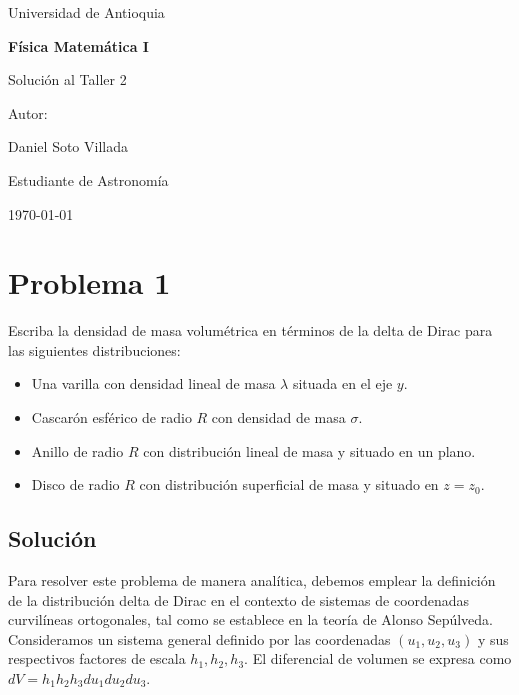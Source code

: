 \documentclass[a4paper]{article}
\begin{document}
\begin{titlepage}
  \centering
  {\Large Universidad de Antioquia\par}
  \vspace{2cm}
  {\huge\bfseries Física Matemática I\par}
  \vspace{0.4cm}
  {\Large Solución al Taller 2 \par}
  \vspace{2.5cm}
  {\large Autor:\par}
  \vspace{0.2cm}
  {\large Daniel Soto Villada\par}
  {\large Estudiante de Astronomía\par}
  \vfill
  {\large \today\par}
\end{titlepage}

\newpage
\tableofcontents
\newpage



\section{Problema 1}
Escriba la densidad de masa volumétrica en términos de la delta de Dirac para las siguientes distribuciones:
\begin{itemize}
    \item Una varilla con densidad lineal de masa $\lambda$ situada en el eje $y.$
    \item Cascarón esférico de radio $R$ con densidad de masa $\sigma.$
    \item Anillo de radio $R$ con distribución lineal de masa y situado en un plano.
    \item Disco de radio $R$ con distribución superficial de masa y situado en $z = z_0.$
\end{itemize}

\subsection{Solución}

Para resolver este problema de manera analítica, debemos emplear la definición de la distribución delta de Dirac en el contexto de sistemas de coordenadas curvilíneas ortogonales, tal como se establece en la teoría de Alonso Sepúlveda. Consideramos un sistema general definido por las coordenadas $(u_1, u_2, u_3)$ y sus respectivos factores de escala $h_1, h_2, h_3.$ El diferencial de volumen se expresa como $dV = h_1 h_2 h_3 du_1 du_2 du_3.$
\end{document}
